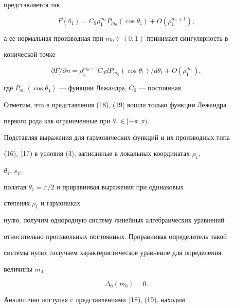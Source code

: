 представляется так 


\begin{equation} 


F(\theta_1)=C_0\rho^{m_0}_1P_{m_0}(\cos\theta_1)+ 


O(\rho^{m_0+1}_1), 


\end{equation} 


а ее нормальная производная при $m_0\in(0,1)$ принимает сингулярность в  


конической точке 


\begin{equation} 


\partial F/\partial n=\rho^{m_0-1}_1C_0d P_{m_0} 


(\cos\theta_1)/d\theta_1+O(\rho^{m_0}_1), 


\end{equation} 


где $P_{m_0}(\cos\theta_1)$ --- функции Лежандра, $C_0$ --- постоянная. 


 


Отметим, что в представления (18), (19) вошли только функции Лежандра  


первого рода как ограниченные при $\theta_1\in[-\pi,\pi)$. 


 


Подставляя выражения для гармонических функций и их производных типа  


(16), (17) в условия (3), записанные в локальных координатах $\rho_1$, 


$\theta_1$, $s_1$, 


полагая $\theta_1=\pi/2$ и приравнивая выражения при одинаковых 


степенях $\rho_1$ и гармониках  


нулю, получим однородную систему линейных алгебраических уравнений  


относительно произвольных постоянных. Приравнивая определитель такой  


системы нулю, получаем характеристическое уравнение для определения  


величины $m_0$ 


\begin{equation} 


\Delta_0(m_0)=0. 


\end{equation} 


Аналогично поступая с представлениями (18), (19), находим 


